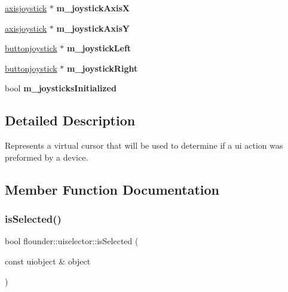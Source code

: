 \begin{DoxyCompactItemize}
\hyperlink{classflounder_1_1axisjoystick}{axisjoystick} $\ast$ {\bfseries m\+\_\+joystick\+AxisX}
\item 
\mbox{\label{classflounder_1_1uiselector_a138ec9b5d846f372063cc714672f6d3a}} 
\hyperlink{classflounder_1_1axisjoystick}{axisjoystick} $\ast$ {\bfseries m\+\_\+joystick\+AxisY}
\item 
\mbox{\label{classflounder_1_1uiselector_a8d342094066c6d366362e0530104b21c}} 
\hyperlink{classflounder_1_1buttonjoystick}{buttonjoystick} $\ast$ {\bfseries m\+\_\+joystick\+Left}
\item 
\mbox{\label{classflounder_1_1uiselector_a52229da85a42a16f535c69d00ebf3b3e}} 
\hyperlink{classflounder_1_1buttonjoystick}{buttonjoystick} $\ast$ {\bfseries m\+\_\+joystick\+Right}
\item 
\mbox{\label{classflounder_1_1uiselector_a71b7a5667332c7c87e9a972d7e826f05}} 
bool {\bfseries m\+\_\+joysticks\+Initialized}
\end{DoxyCompactItemize}


\subsection{Detailed Description}
Represents a virtual cursor that will be used to determine if a ui action was preformed by a device. 



\subsection{Member Function Documentation}
\mbox{\label{classflounder_1_1uiselector_a308e91174313dbb9073053bbde938134}} 
\subsubsection{\texorpdfstring{is\+Selected()}{isSelected()}}
{\footnotesize\ttfamily bool flounder\+::uiselector\+::is\+Selected (\begin{DoxyParamCaption}\item[{const uiobject \&}]{object }\end{DoxyParamCaption})}



